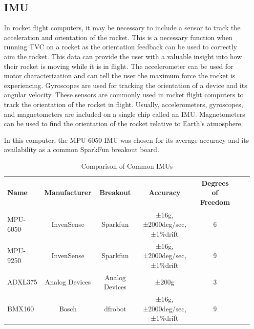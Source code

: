 \documentclass[conf]{new-aiaa}
\begin{document}

\subsection{IMU}

In rocket flight computers, it may be necessary to include a sensor to track the acceleration and orientation of the rocket. This is a necessary function when running TVC on a rocket as the orientation feedback can be used to correctly aim the rocket. This data can provide the user with a valuable insight into how their rocket is moving while it is in flight. The accelerometer can be used for motor characterization and can tell the user the maximum force the rocket is experiencing. Gyroscopes are used for tracking the orientation of a device and its angular velocity. These sensors are commonly used in rocket flight computers to track the orientation of the rocket in flight. Usually, accelerometers, gyroscopes, and magnetometers are included on a single chip called an IMU. Magnetometers can be used to find the orientation of the rocket relative to Earth's atmosphere. 

In this computer, the MPU-6050 IMU was chosen for its average accuracy\cite{mpu6050} and its availability as a common SparkFun breakout board\cite{mpu6050sparkfun}. 

 \begin{table}[H]
 \caption{\label{tab:imus} Comparison of Common IMUs}
 \centering
 \begin{tabular}{lcccccc}
 
 \hline Name & Manufacturer & Breakout & Accuracy & Degrees of Freedom\footnotemark[1] \\ \hline

 MPU-6050\cite{mpu6050} & InvenSense & Sparkfun\cite{mpu6050sparkfun} & ±16g, ±2000deg/sec, ±1\%drift & 6\\
 MPU-9250 & InvenSense & Sparkfun\cite{mpu9250sparkfun} & ±16g, ±2000deg/sec, ±1\%drift & 9\\
 ADXL375\cite{adxl375} & Analog Devices & Analog Devices\cite{adxl375adevices} & ±200g & 3\\
 BMX160 & Bosch & dfrobot\cite{bmx160dfrobot} & ±16g, ±2000deg/sec, ±1\%drift & 9\\
 
 \hline
 \end{tabular}
 \end{table}
\end{document}

